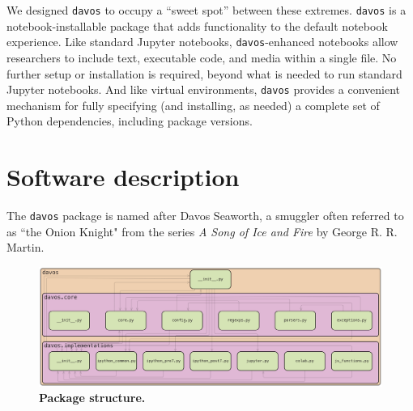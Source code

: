 \documentclass[preprint,12pt,a4paper]{elsarticle}
\begin{document}
We designed \texttt{davos} to occupy a ``sweet spot'' between these
extremes.  \texttt{davos} is a notebook-installable package that adds
functionality to the default notebook experience. Like standard
Jupyter notebooks, \texttt{davos}-enhanced notebooks allow
researchers to include text, executable code, and media within a
single file. No further setup or installation is required, beyond
what is needed to run standard Jupyter notebooks. And like virtual
environments, \texttt{davos} provides a convenient mechanism for fully
specifying (and installing, as needed) a complete set of Python
dependencies, including package versions.




\section{Software description}
The \texttt{davos} package is named after Davos Seaworth, a smuggler often referred to as ``the Onion Knight" from the series \textit{A Song of Ice and Fire} by George R. R. Martin.

\begin{figure}[tp]
\centering
\includegraphics[width=\textwidth]{figs/package_structure}
\caption{\small \textbf{Package structure.} }
\label{fig:package-structure}
\end{figure}
\end{document}
